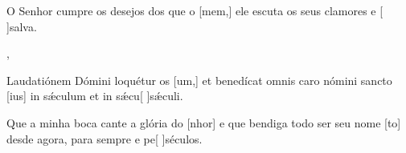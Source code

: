 {    {\item {}O Senhor cumpre os desejos dos que o [mem,] ele escuta os seus clamores e [ ]{sal}va.~\Responsorium},
  {\item {}Laudatiónem Dómini loquétur os [um,] et benedícat omnis caro nómini sancto [ius] in sǽculum et in sǽcu[ ]{sǽ}culi.~\Responsorium}%
    {\item {}Que a minha boca cante a glória do [nhor] e que bendiga todo ser seu nome [to] desde agora, para sempre e pe[ ]{sé}culos.~\Responsorium}
}
